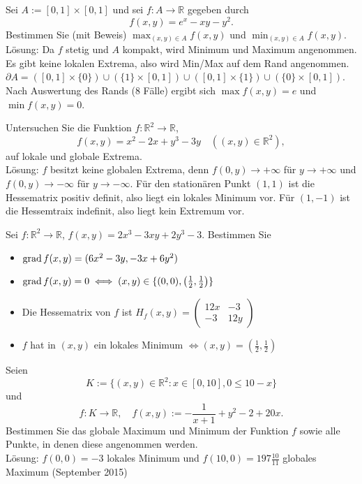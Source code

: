 \documentclass[parskip=full]{scrartcl}
\begin{document}
Sei $A := [0,1] \times [0,1]$ und sei $f : A \to \mathbb{R}$ gegeben durch
\begin{displaymath}
  f(x,y) = e^x - xy - y^2.
\end{displaymath}
Bestimmen Sie (mit Beweis) $\max_{(x,y) \in A} f(x,y)$ und $\min_{(x,y) \in A} f(x,y)$.\\
Lösung:
Da $f$ stetig und $A$ kompakt, wird Minimum und Maximum angenommen.
Es gibt keine lokalen Extrema, also wird Min/Max auf dem Rand angenommen.
$\partial A = ([0,1] \times \{0\}) \cup (\{1\} \times [0,1]) \cup ([0,1] \times \{1\}) \cup (\{0\} \times [0,1])$.
Nach Auswertung des Rands (8 Fälle) ergibt sich $\max f(x,y) = e$ und $\min f(x,y) = 0$.

Untersuchen Sie die Funktion $f : \mathbb{R}^2 \to \mathbb{R}$,
\begin{displaymath}
  f(x,y) = x^2 - 2x + y^3 - 3y \quad ((x,y) \in \mathbb{R}^2),
\end{displaymath}
auf lokale und globale Extrema.\\
Lösung:
$f$ besitzt keine globalen Extrema, denn $f(0,y) \to +\infty$ für $y \to +\infty$ und $f(0,y) \to -\infty$ für $y \to -\infty$.
Für den stationären Punkt $(1,1)$ ist die Hessematrix positiv definit, also liegt ein lokales Minimum vor.
Für $(1,-1)$ ist die Hessemtraix indefinit, also liegt kein Extremum vor.

Sei $f : \mathbb{R}^2 \to \mathbb{R}$, $f(x,y) = 2x^3 - 3xy + 2y^3 - 3$.
Bestimmen Sie
\begin{itemize}
    \item $\operatorname{grad} f(x,y) = (6x^2 - 3y, -3x + 6y^2)$
    \item $\operatorname{grad} f(x,y) = 0 \iff (x,y) \in \{(0,0), \left(\frac{1}{2}, \frac{1}{2}\right)\}$
    \item Die Hessematrix von $f$ ist $H_f(x,y) = \begin{pmatrix} 12x & -3\\-3 & 12y\end{pmatrix}$
    \item $f$ hat in $(x,y)$ ein lokales Minimum $\iff (x,y) = \left(\frac{1}{2}, \frac{1}{2}\right)$
\end{itemize}

Seien
\begin{displaymath}
  K := \{(x,y) \in \mathbb{R}^2 : x\in [0,10], 0 \leq 10 - x\}
\end{displaymath}
und
\begin{displaymath}
  f : K \to \mathbb{R}, \quad f(x,y) := - \frac{1}{x + 1} + y^2 - 2 + 20x.
\end{displaymath}
Bestimmen Sie das globale Maximum und Minimum der Funktion $f$ sowie alle Punkte, in denen diese angenommen werden.\\
Lösung:
$f(0,0) = -3$ lokales Minimum und $f(10,0) = 197 \frac{10}{11}$ globales Maximum
(September 2015)
\end{document}
